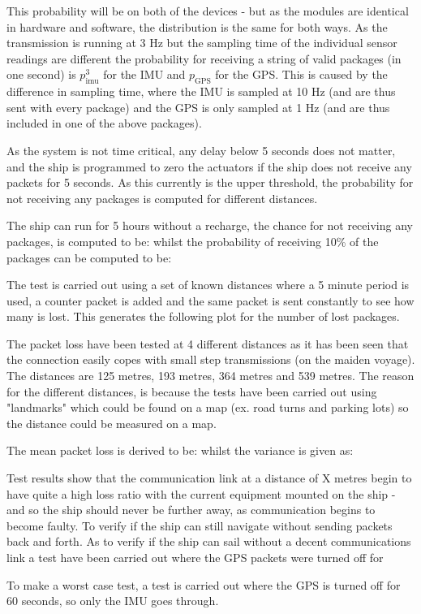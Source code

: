 This probability will be on both of the devices - but as the modules are identical in hardware and software, the distribution is the same for both ways. As the transmission is running at 3 Hz but the sampling time of the individual sensor readings are different the probability for receiving a string of valid packages (in one second) is $p_\text{imu}^{3}$ for the IMU and $p_\text{GPS}$ for the GPS. This is caused by the difference in sampling time, where the IMU is sampled at 10 Hz (and are thus sent with every package) and the GPS is only sampled at 1 Hz (and are thus included in one of the above packages). 

As the system is not time critical, any delay below 5 seconds does not matter, and the ship is programmed to zero the actuators if the ship does not receive any packets for 5 seconds. As this currently is the upper threshold, the probability for not receiving any packages is computed for different distances. 

The ship can run for 5 hours without a recharge, the chance for not receiving any packages, is computed to be: whilst the probability of receiving 10\% of the packages can be computed to be:

The test is carried out using a set of known distances where a 5 minute period is used, a counter packet is added and the same packet is sent constantly to see how many is lost. This generates the following plot for the number of lost packages. 

The packet loss have been tested at 4 different distances as it has been seen that the connection easily copes with small step transmissions (on the maiden voyage). The distances are 125 metres, 193 metres, 364 metres and 539 metres. The reason for the different distances, is because the tests have been carried out using "landmarks" which could be found on a map (ex. road turns and parking lots) so the distance could be measured on a map.

The mean packet loss is derived to be: whilst the variance is given as: 

Test results show that the communication link at a distance of X metres begin to have quite a high loss ratio with the current equipment mounted on the ship - and so the ship should never be further away, as communication begins to become faulty. To verify if the ship can still navigate without sending packets back and forth. As to verify if the ship can sail without a decent communications link a test have been carried out where the GPS packets were turned off for 

To make a worst case test, a test is carried out where the GPS is turned off for 60 seconds, so only the IMU goes through. 